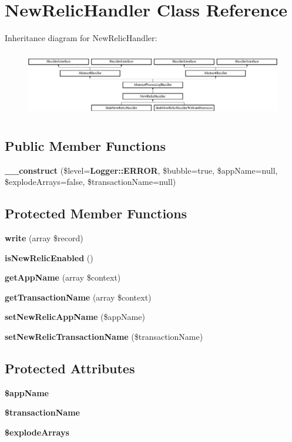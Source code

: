 \section{New\+Relic\+Handler Class Reference}
\label{class_monolog_1_1_handler_1_1_new_relic_handler}
Inheritance diagram for New\+Relic\+Handler\+:\begin{figure}[H]
\begin{center}
\leavevmode
\includegraphics[height=2.941177cm]{class_monolog_1_1_handler_1_1_new_relic_handler}
\end{center}
\end{figure}
\subsection*{Public Member Functions}
\begin{DoxyCompactItemize}
\item 
{\bf \+\_\+\+\_\+construct} (\$level={\bf Logger\+::\+E\+R\+R\+O\+R}, \$bubble=true, \$app\+Name=null, \$explode\+Arrays=false, \$transaction\+Name=null)
\end{DoxyCompactItemize}
\subsection*{Protected Member Functions}
\begin{DoxyCompactItemize}
\item 
{\bf write} (array \$record)
\item 
{\bf is\+New\+Relic\+Enabled} ()
\item 
{\bf get\+App\+Name} (array \$context)
\item 
{\bf get\+Transaction\+Name} (array \$context)
\item 
{\bf set\+New\+Relic\+App\+Name} (\$app\+Name)
\item 
{\bf set\+New\+Relic\+Transaction\+Name} (\$transaction\+Name)
\end{DoxyCompactItemize}
\subsection*{Protected Attributes}
\begin{DoxyCompactItemize}
\item 
{\bf \$app\+Name}
\item 
{\bf \$transaction\+Name}
\item 
{\bf \$explode\+Arrays}
\end{DoxyCompactItemize}


